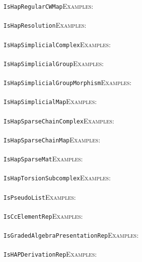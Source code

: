 \documentclass[a4paper,11pt]{report}
\begin{document}
{{ \texttt{IsHapRegularCWMap}{\nobreakspace}{\nobreakspace}{\nobreakspace}{\nobreakspace}\textsc{Examples:} \\
 \\
 \texttt{IsHapResolution}{\nobreakspace}{\nobreakspace}{\nobreakspace}{\nobreakspace}\textsc{Examples:} \\
 \\
 \texttt{IsHapSimplicialComplex}{\nobreakspace}{\nobreakspace}{\nobreakspace}{\nobreakspace}\textsc{Examples:} \\
 \\
 \texttt{IsHapSimplicialGroup}{\nobreakspace}{\nobreakspace}{\nobreakspace}{\nobreakspace}\textsc{Examples:} \\
 \\
 \texttt{IsHapSimplicialGroupMorphism}{\nobreakspace}{\nobreakspace}{\nobreakspace}{\nobreakspace}\textsc{Examples:} \\
 \\
 \texttt{IsHapSimplicialMap}{\nobreakspace}{\nobreakspace}{\nobreakspace}{\nobreakspace}\textsc{Examples:} \\
 \\
 \texttt{IsHapSparseChainComplex}{\nobreakspace}{\nobreakspace}{\nobreakspace}{\nobreakspace}\textsc{Examples:} \\
 \\
 \texttt{IsHapSparseChainMap}{\nobreakspace}{\nobreakspace}{\nobreakspace}{\nobreakspace}\textsc{Examples:} \\
 \\
 \texttt{IsHapSparseMat}{\nobreakspace}{\nobreakspace}{\nobreakspace}{\nobreakspace}\textsc{Examples:} \\
 \\
 \texttt{IsHapTorsionSubcomplex}{\nobreakspace}{\nobreakspace}{\nobreakspace}{\nobreakspace}\textsc{Examples:} \\
 \\
 \texttt{IsPseudoList}{\nobreakspace}{\nobreakspace}{\nobreakspace}{\nobreakspace}\textsc{Examples:} \\
 \\
 \texttt{IsCcElementRep}{\nobreakspace}{\nobreakspace}{\nobreakspace}{\nobreakspace}\textsc{Examples:} \\
 \\
 \texttt{IsGradedAlgebraPresentationRep}{\nobreakspace}{\nobreakspace}{\nobreakspace}{\nobreakspace}\textsc{Examples:} \\
 \\
 \texttt{IsHAPDerivationRep}{\nobreakspace}{\nobreakspace}{\nobreakspace}{\nobreakspace}\textsc{Examples:} \\
}}
\end{document}
